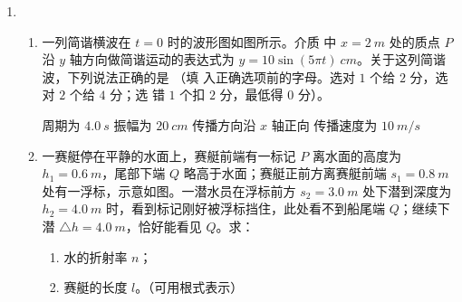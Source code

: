 \begin{enumerate}
\begin{enumerate}
\end{enumerate}


\item
{}
\begin{enumerate}
	\item
一列简谐横波在 $ t=0 $ 时的波形图如图所示。介质
中 $ x=2 \ m $ 处的质点 $ P $ 沿 $ y $ 轴方向做简谐运动的表达式为 $ y=10 \sin (5 \pi t ) \ cm $。关于这列简谐波，下列说法正确的是 \underlinegap （填
入正确选项前的字母。选对 $ 1 $ 个给 $ 2 $ 分，选对 $ 2 $ 个给 $ 4 $ 分；选
错 $ 1 $ 个扣 $ 2 $ 分，最低得 $ 0 $ 分）。
\begin{figure}[h!]
	\centering
	
\end{figure}

\fourchoices
{周期为 $ 4.0 \ s $}
{振幅为 $ 20 \ cm $}
{传播方向沿 $ x $ 轴正向}
{传播速度为 $ 10 \ m /s $}


\item 
一赛艇停在平静的水面上，赛艇前端有一标记 $ P $ 离水面的高度为 $ h_{1} =0.6 \ m $，尾部下端
$ Q $ 略高于水面；赛艇正前方离赛艇前端 $ s_{1} =0.8 \ m $ 处有一浮标，示意如图。一潜水员在浮标前方
$ s_{2} =3.0 \ m $ 处下潜到深度为 $ h_{2} =4.0 \ m $ 时，看到标记刚好被浮标挡住，此处看不到船尾端 $ Q $；继续下潜
$ \triangle h=4.0 \ m $，恰好能看见 $ Q $。求：
\begin{enumerate}
	\item
水的折射率 $ n $；
\item 
赛艇的长度 $ l $。（可用根式表示）
\end{enumerate}
\begin{figure}[h!]
	\flushright
	
\end{figure}






\end{enumerate}
\end{enumerate}
